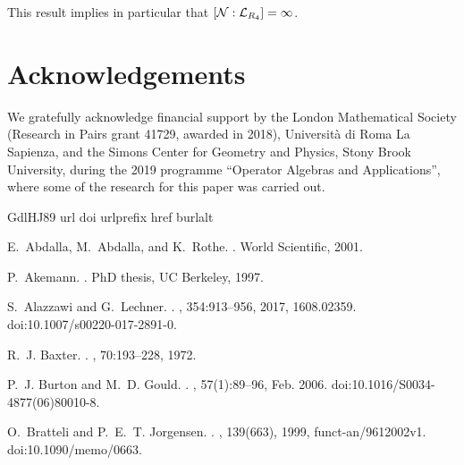 \documentclass[12pt,a4paper]{amsart}
\numberwithin{equation}{section}
\theoremstyle{remark}
\begin{document}
This result implies in particular that $[\mathcal{N}:\mathcal{L}_{R_4}]=\infty$.

\section*{Acknowledgements}

We gratefully acknowledge financial support by the London Mathematical Society (Research in Pairs grant 41729, awarded in 2018), Università di Roma La Sapienza, and the Simons Center for Geometry and Physics, Stony Brook University, during the 2019 programme ``Operator Algebras and Applications'', where some of the research for this paper was carried out.


\begin{thebibliography}{GdlHJ89}
\expandafter\ifx\csname url\endcsname\relax
  \def\url#1{\texttt{#1}}\fi
\expandafter\ifx\csname doi\endcsname\relax
  \def\doi#1{\burlalt{doi:#1}{http://dx.doi.org/#1}}\fi
\expandafter\ifx\csname urlprefix\endcsname\relax\def\urlprefix{URL }\fi
\expandafter\ifx\csname href\endcsname\relax
  \def\href#1#2{#2}\fi
\expandafter\ifx\csname burlalt\endcsname\relax
  \def\burlalt#1#2{\href{#2}{#1}}\fi

E.~Abdalla, M.~Abdalla, and K.~Rothe.
.
\newblock World Scientific, 2001.

P.~Akemann.
.
\newblock PhD thesis, UC Berkeley, 1997.

S.~Alazzawi and G.~Lechner.
.
, 354:913--956, 2017,
  \burlalt{1608.02359}{http://arxiv.org/abs/1608.02359}.
\newblock \doi{10.1007/s00220-017-2891-0}.

R.~J. Baxter.
.
, 70:193--228, 1972.

P.~J. Burton and M.~D. Gould.
.
, 57(1):89--96, Feb. 2006.
\newblock \doi{10.1016/S0034-4877(06)80010-8}.

O.~Bratteli and P.~E.~T. Jorgensen.
.
, 139(663), 1999,
  \burlalt{funct-an/9612002v1}{http://arxiv.org/abs/funct-an/9612002v1}.
\newblock \doi{10.1090/memo/0663}.


\end{thebibliography}
\end{document}
